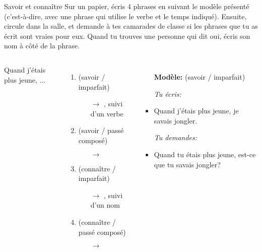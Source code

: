 \begin{frame}{Savoir et connaître}
  \small
  Sur un papier, écris 4 phrases en suivant le modèle présenté (c'est-à-dire, avec une phrase qui utilise le verbe et le temps indiqué).
  Ensuite, circule dans la salle, et demande à tes camarades de classe si les phrases que tu as écrit sont vraies pour eux.
  Quand tu trouves une personne qui dit oui, écris son nom à côté de la phrase.
  \vspace{0.25cm}
  \begin{columns}
    \small
      Quand j'étais plus jeune, ...
      \begin{enumerate}
        \item {}(savoir / imparfait)
        \begin{itemize}
          \scriptsize
          \item[$\to$] , suivi d'un verbe
        \end{itemize}
        \item {}(savoir / passé composé)
        \begin{itemize}
          \scriptsize
          \item[$\to$] 
        \end{itemize}
        \item {}(connaître / imparfait)
        \begin{itemize}
          \scriptsize
          \item[$\to$] , suivi d'un nom
        \end{itemize}
        \item {}(connaître / passé composé)
        \begin{itemize}
          \scriptsize
          \item[$\to$] 
        \end{itemize}
      \end{enumerate}
      \begin{itemize}
        \item[] \textbf{Modèle:} (savoir / imparfait)
        \item[] \emph{Tu écris:}
        \item Quand j'étais plus jeune, je savais jongler.
        \item[] \emph{Tu demandes:}
        \item Quand tu étais plus jeune, est-ce que tu savais jongler?
      \end{itemize}
  \end{columns}
\end{frame}
